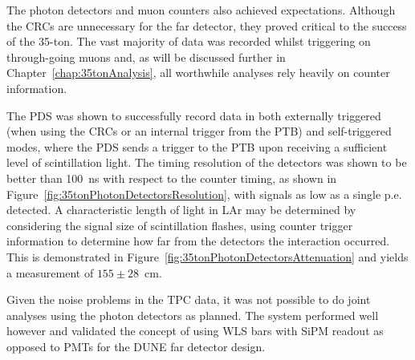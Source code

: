 The photon detectors and muon counters also achieved expectations.  Although the CRCs are unnecessary for the far detector, they proved critical to the success of the 35-ton.  The vast majority of data was recorded whilst triggering on through-going muons and, as will be discussed further in Chapter~\ref{chap:35tonAnalysis}, all worthwhile analyses rely heavily on counter information.

The PDS was shown to successfully record data in both externally triggered (when using the CRCs or an internal trigger from the PTB) and self-triggered modes, where the PDS sends a trigger to the PTB upon receiving a sufficient level of scintillation light.  The timing resolution of the detectors was shown to be better than 100~ns with respect to the counter timing, as shown in Figure~\ref{fig:35tonPhotonDetectorsResolution}, with signals as low as a single p.e. detected.  A characteristic length of light in LAr may be determined by considering the signal size of scintillation flashes, using counter trigger information to determine how far from the detectors the interaction occurred.  This is demonstrated in Figure~\ref{fig:35tonPhotonDetectorsAttenuation} and yields a measurement of $155\pm28$~cm.

Given the noise problems in the TPC data, it was not possible to do joint analyses using the photon detectors as planned.  The system performed well however and validated the concept of using WLS bars with SiPM readout as opposed to PMTs for the DUNE far detector design.

